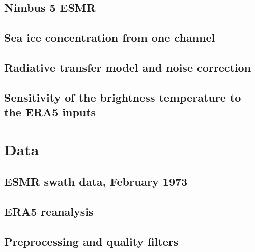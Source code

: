 \documentclass{article}
\begin{document}
\subsection{Nimbus 5 ESMR}

\subsection{Sea ice concentration from one channel}

\subsection{Radiative transfer model and noise correction}

\subsection{Sensitivity of the brightness temperature to the ERA5 inputs}

\section{Data} %

\subsection{ESMR swath data, February 1973}

\subsection{ERA5 reanalysis}

\subsection{Preprocessing and quality filters}

\end{document}
